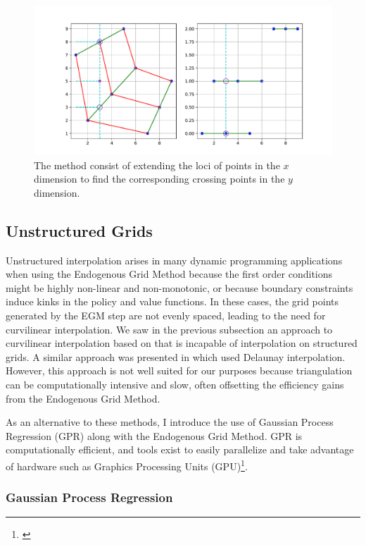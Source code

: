 \documentclass[\econtexRoot/SequentialEGM]{subfiles}
\begin{document}
\begin{figure}
    \centering
    \includegraphics[width=0.8\linewidth]{Figures/Mapping.pdf}
    \caption{The method consist of extending the loci of points in the $x$ dimension to find the corresponding crossing points in the $y$ dimension.}
    \notinsubfile{\label{fig:mapping}}
\end{figure}



\subsection{Unstructured Grids}

Unstructured interpolation arises in many dynamic programming applications when using the Endogenous Grid Method because the first order conditions might be highly non-linear and non-monotonic, or because boundary constraints induce kinks in the policy and value functions. In these cases, the grid points generated by the EGM step are not evenly spaced, leading to the need for curvilinear interpolation. We saw in the previous subsection an approach to curvilinear interpolation based on \cite{White2015-fg} that is incapable of interpolation on structured grids. A similar approach was presented in \cite{Ludwig2018-uz} which used Delaunay interpolation. However, this approach is not well suited for our purposes because triangulation can be computationally intensive and slow, often offsetting the efficiency gains from the Endogenous Grid Method.

As an alternative to these methods, I introduce the use of Gaussian Process Regression (GPR) along with the Endogenous Grid Method. GPR is computationally efficient, and tools exist to easily parallelize and take advantage of hardware such as Graphics Processing Units (GPU)\footnote{\cite{Gardner2018-mv}}.


\subsubsection{Gaussian Process Regression}
\end{document}
